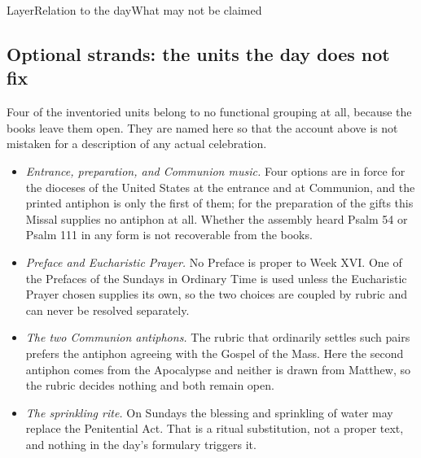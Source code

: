 \begin{threecoltable}{Layer}{Relation to the day}{What may not be claimed}
\end{threecoltable}

\subsection*{Optional strands: the units the day does not fix}

Four of the inventoried units belong to no functional grouping at all, because
the books leave them open. They are named here so that the account above is not
mistaken for a description of any actual celebration.

\begin{itemize}
\item \emph{Entrance, preparation, and Communion music.} Four options are in
force for the dioceses of the United States at the entrance and at Communion,
and the printed antiphon is only the first of them; for the preparation of the
gifts this Missal supplies no antiphon at all. Whether the assembly heard
Psalm 54 or Psalm 111 in any form is not recoverable from the books.
\item \emph{Preface and Eucharistic Prayer.} No Preface is proper to Week XVI.
One of the Prefaces of the Sundays in Ordinary Time is used unless the
Eucharistic Prayer chosen supplies its own, so the two choices are coupled by
rubric and can never be resolved separately.
\item \emph{The two Communion antiphons.} The rubric that ordinarily settles
such pairs prefers the antiphon agreeing with the Gospel of the Mass. Here the
second antiphon comes from the Apocalypse and neither is drawn from Matthew,
so the rubric decides nothing and both remain open.
\item \emph{The sprinkling rite.} On Sundays the blessing and sprinkling of
water may replace the Penitential Act. That is a ritual substitution, not a
proper text, and nothing in the day's formulary triggers it.
\end{itemize}

